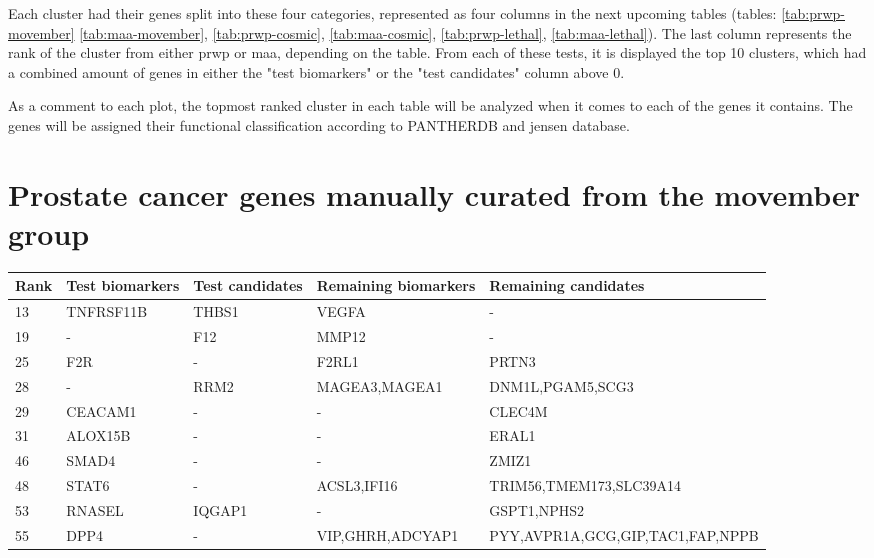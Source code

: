 Each cluster had their genes split into these four categories, represented as
four columns in the next upcoming tables (tables: \ref{tab:prwp-movember}
\ref{tab:maa-movember}, \ref{tab:prwp-cosmic}, \ref{tab:maa-cosmic},
\ref{tab:prwp-lethal}, \ref{tab:maa-lethal}). The last column represents the
rank of the cluster from either \gls{prwp} or \gls{maa}, depending on the table.
From each of these tests, it is displayed the top 10 clusters, which had
a combined amount of genes in either the "test biomarkers" or the "test
candidates" column above 0.

As a comment to each plot, the topmost ranked cluster in each table will be
analyzed when it comes to each of the genes it contains. The genes will be
assigned their functional classification according to PANTHERDB and \gls{jensen}
database\cite{pantherdb,panther,disgenet}.

\section{Prostate cancer genes manually curated from the movember group}
\begin{sidewaystable}
    \begin{tabular}{|l|l|l|l|l|}
        \hline
        \textbf{Rank}
        & \textbf{Test biomarkers}
        & \textbf{Test candidates}
        & \textbf{Remaining biomarkers}
        & \textbf{Remaining candidates} \\
        \hline
        13	& TNFRSF11B	& THBS1	& VEGFA	& - \\
        \hline
        19	& -	& F12	& MMP12	& - \\
        \hline
        25	& F2R	& -	& F2RL1	& PRTN3 \\
        \hline
        28	& -	& RRM2	& MAGEA3,MAGEA1	& DNM1L,PGAM5,SCG3 \\
        \hline
        29	& CEACAM1	& -	& -	& CLEC4M \\
        \hline
        31	& ALOX15B	& -	& -	& ERAL1 \\
        \hline
        46	& SMAD4	& -	& -	& ZMIZ1 \\
        \hline
        48	& STAT6	& -	& ACSL3,IFI16	& TRIM56,TMEM173,SLC39A14 \\
        \hline
        53	& RNASEL	& IQGAP1	& -	& GSPT1,NPHS2 \\
        \hline
        55	& DPP4	& -	& VIP,GHRH,ADCYAP1	& PYY,AVPR1A,GCG,GIP,TAC1,FAP,NPPB \\
        \hline
    \end{tabular}
    \caption{iRefWeb network ranked with PRWP and movember data - matched 254 
    test genes from movember data set out of 271 possible}
    \label{tab:prwp-movember}
\end{sidewaystable}

